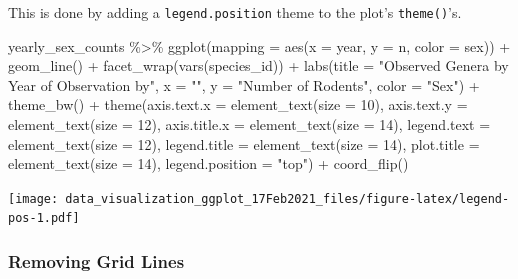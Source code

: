 \documentclass[
]{article}
\newenvironment{Shaded}{\begin{snugshade}}{\end{snugshade}}
\newcommand{\AttributeTok}[1]{\textcolor[rgb]{0.77,0.63,0.00}{#1}}
\newcommand{\DecValTok}[1]{\textcolor[rgb]{0.00,0.00,0.81}{#1}}
\newcommand{\FunctionTok}[1]{\textcolor[rgb]{0.00,0.00,0.00}{#1}}
\newcommand{\NormalTok}[1]{#1}
\newcommand{\SpecialCharTok}[1]{\textcolor[rgb]{0.00,0.00,0.00}{#1}}
\newcommand{\StringTok}[1]{\textcolor[rgb]{0.31,0.60,0.02}{#1}}
\begin{document}
This is done by adding a \texttt{legend.position} theme to the plot's
\texttt{theme()}'s.

\begin{Shaded}
\begin{Highlighting}[]
\NormalTok{yearly\_sex\_counts }\SpecialCharTok{\%\textgreater{}\%} 
  \FunctionTok{ggplot}\NormalTok{(}\AttributeTok{mapping =} \FunctionTok{aes}\NormalTok{(}\AttributeTok{x =}\NormalTok{ year, }\AttributeTok{y =}\NormalTok{ n, }\AttributeTok{color =}\NormalTok{ sex)) }\SpecialCharTok{+}
  \FunctionTok{geom\_line}\NormalTok{() }\SpecialCharTok{+}
  \FunctionTok{facet\_wrap}\NormalTok{(}\FunctionTok{vars}\NormalTok{(species\_id)) }\SpecialCharTok{+}
  \FunctionTok{labs}\NormalTok{(}\AttributeTok{title =} \StringTok{"Observed Genera by Year of Observation by"}\NormalTok{,}
       \AttributeTok{x =} \StringTok{""}\NormalTok{,}
       \AttributeTok{y =} \StringTok{"Number of Rodents"}\NormalTok{, }
       \AttributeTok{color =} \StringTok{"Sex"}\NormalTok{) }\SpecialCharTok{+}
  \FunctionTok{theme\_bw}\NormalTok{() }\SpecialCharTok{+}
  \FunctionTok{theme}\NormalTok{(}\AttributeTok{axis.text.x =} \FunctionTok{element\_text}\NormalTok{(}\AttributeTok{size =} \DecValTok{10}\NormalTok{), }
        \AttributeTok{axis.text.y =} \FunctionTok{element\_text}\NormalTok{(}\AttributeTok{size =} \DecValTok{12}\NormalTok{), }
        \AttributeTok{axis.title.x =} \FunctionTok{element\_text}\NormalTok{(}\AttributeTok{size =} \DecValTok{14}\NormalTok{),}
        \AttributeTok{legend.text =} \FunctionTok{element\_text}\NormalTok{(}\AttributeTok{size =} \DecValTok{12}\NormalTok{),}
        \AttributeTok{legend.title =} \FunctionTok{element\_text}\NormalTok{(}\AttributeTok{size =} \DecValTok{14}\NormalTok{),}
        \AttributeTok{plot.title =} \FunctionTok{element\_text}\NormalTok{(}\AttributeTok{size =} \DecValTok{14}\NormalTok{), }
        \AttributeTok{legend.position =} \StringTok{"top"}\NormalTok{) }\SpecialCharTok{+} 
  \FunctionTok{coord\_flip}\NormalTok{()}
\end{Highlighting}
\end{Shaded}

\texttt{[image: data\_visualization\_ggplot\_17Feb2021\_files/figure-latex/legend-pos-1.pdf]}

\hypertarget{removing-grid-lines}{%
\subsubsection{Removing Grid Lines}\label{removing-grid-lines}}
\end{document}
